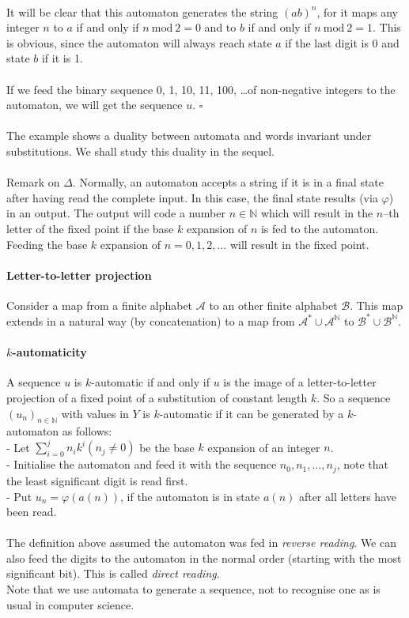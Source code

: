 \documentclass{article}
\begin{document}
\\
It will be clear that this automaton generates the string $(ab)^n$, for it
maps any integer $n$ to $a$ if and only if $n \mathrm{\ mod\ } 2 = 0$ and to
$b$ if and only if $n \mathrm{\ mod\ } 2 = 1$. This is obvious, since the
automaton will always reach state $a$ if the last digit is 0 and state $b$ 
if it is 1.\\
\\
If we feed the binary sequence 0, 1, 10, 11, 100, \ldots of non-negative 
integers to the automaton, we will get the sequence $u$. $\square$\\
\\
The example shows a duality between automata and words invariant under 
substitutions. We shall study this duality in the sequel.\\
\\
Remark on $\Delta$. Normally, an automaton accepts a string if it is in
a final state after having read the complete input. In this case, the final 
state results (via $\varphi$) in an output. The output will code a number
$n \in \mathbb{N}$ which will result in the $n$--th letter of the fixed point
if the base $k$ expansion of $n$ is fed to the automaton. Feeding the base
$k$ expansion of $n = 0, 1, 2, \ldots$ will result in the fixed point.

\paragraph{Letter-to-letter projection} Consider a map from a finite alphabet
$\mathcal{A}$ to an other finite alphabet $\mathcal{B}$. This map extends in
a natural way (by concatenation) to a map from
$\mathcal{A}^* \cup \mathcal{A}^\mathbb{N}$ to
$\mathcal{B}^* \cup \mathcal{B}^\mathbb{N}$.

\paragraph{$k$-automaticity} A sequence $u$ is $k$-automatic if and only if
$u$ is the image of a letter-to-letter projection of a fixed point of a
substitution of constant length $k$. So a sequence $(u_n)_{n \in \mathbb{N}}$
with values in $Y$ is $k$-automatic if it can be generated by a $k$-automaton
as follows:\\
- Let $\sum_{i=0}^j n_i k^i (n_j \neq 0)$ be the base $k$ expansion of an
  integer $n$.\\
- Initialise the automaton and feed it with the sequence 
$n_0, n_1, \ldots, n_j$, note that the least significant digit is read first.\\
- Put $u_n = \varphi(a(n))$, if the automaton is in state $a(n)$ after all 
letters have been read.\\
\\
The definition above assumed the automaton was fed in \emph{reverse reading}.
We can also feed the digits to the automaton in the normal order (starting with
the most significant bit). This is called \emph{direct reading}.\\
Note that we use automata to generate a sequence, not to recognise one as is
usual in computer science.
\end{document}
